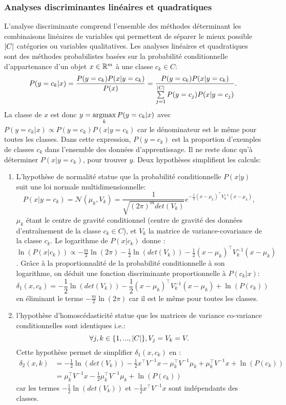 \subsubsection{Analyses discriminantes linéaires et quadratiques}
L'analyse discriminante comprend l'ensemble des méthodes déterminant les combinaisons linéaires de variables qui permettent de séparer le mieux possible ${\vert C\vert}$ catégories ou variables qualitatives. Les analyses linéaires et quadratiques sont des méthodes probabilistes basées sur la probabilité conditionnelle d'appartenance d'un objet $x \in \mathbb{R}^m$ à une classe $c_k \in C$: \[P(y=c_k \vert x) = \frac{P(y=c_k) P(x \vert y=c_k)}{P(x)} = \frac{P(y=c_k) P(x \vert y=c_k)}{\sum\limits_{j = 1}^{\vert C\vert} P(y=c_j) P(x \vert y=c_j)}.\]
La classe de $x$ est donc $y = \mathop{\mathrm{argmax}}\limits_k P(y=c_k \vert x)$ avec $P(y=c_k \vert x) \propto P(y=c_k) P(x \vert y=c_k)$ car le dénominateur est le même pour toutes les classes. Dans cette expression, $P(y=c_k)$ est la proportion d'exemples de classes $c_k$ dans l'ensemble des données d'apprentissage. Il ne reste donc qu'à déterminer $P(x \vert y=c_k)$, pour trouver $y$. 
Deux hypothèses simplifient les calculs:
\begin{enumerate}
	\item L'hypothèse de normalité statue que la probabilité conditionnelle $P(x \vert y)$ suit une loi normale multidimensionnelle: \[P(x \vert y = c_k) = \mathcal{N}(\mu_k, V_k) = \frac{1}{\sqrt{(2\pi)^m det(V_k)}}e^{-\frac{1}{2}(x - \mu_k)^\top V_k^{-1}(x - \mu_k)}, \] $\mu_k$ étant le centre de gravité conditionnel (centre de gravité des données d'entraînement de la classe $c_k \in C$), et $V_k$ la matrice de variance-covariance de la classe $c_k$. Le logarithme de $P(x\vert c_k)$ donne :
	$\ln\left(P(x \vert c_k)\right) \propto -\frac{m}{2}\ln(2\pi) -\frac{1}{2} \ln(det(V_k)) -\frac{1}{2}(x - \mu_k)^\top V_k^{-1}(x - \mu_k)$ \citep{ghojogh2019ldaqdatutorial}. Grâce à la proportionnalité de la probabilité conditionnelle à son logarithme, on déduit une fonction discriminante proportionnelle à $P(c_k \vert x)$:
	\[\delta_1(x, c_k) = -\frac{1}{2} \ln(det(V_k)) -\frac{1}{2} (x-\mu_k)^\top V_k^{-1}(x-\mu_k) + \ln(P(c_k)) \]
	en éliminant le terme $-\frac{m}{2}\ln(2\pi)$ car il est le même pour toutes les classes.
	\item l'hypothèse d'homoscédasticité statue que les matrices de variance co-variance conditionnelles sont identiques i.e.: \[\forall j, k \in \lbrace 1,...,{\vert C\vert} \rbrace, V_j = V_k = V.\] Cette hypothèse permet de simplifier $\delta_1(x, c_k)$ en :
	\[\begin{array}{rl}
	\delta_2(x,k) & = -\frac{1}{2} \ln(det(V_k)) -\frac{1}{2} x^\top V^{-1} x - \mu_k^\top V^{-1} \mu_k + \mu_k^\top V^{-1} x+ \ln(P(c_k))\\
	 & = \mu_k^\top V^{-1} x - \frac{1}{2} \mu_k^\top V^{-1}\mu_k +\ln(P(c_k))
	\end{array} \]
	car les termes $-\frac{1}{2} \ln(det(V_k))$ et $-\frac{1}{2}  x^\top V^{-1} x$ sont indépendants des classes.
\end{enumerate}

